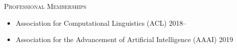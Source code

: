 \documentclass[11pt]{article}
\renewcommand{\section}[1]
{\vspace{1.0\baselineskip}{\Large\textbf{#1}}}
\newcommand{\makecolophon}
{\centering\ding{118} Last modified on \today~\ding{118}}
\begin{document}
\textsc{Professional Memberships}
\begin{itemize}[leftmargin=12pt]
  \item[] Association for Computational Linguistics (ACL) \hfill 2018--
  \item[] Association for the Advancement of Artificial Intelligence (AAAI) \hfill 2019
\end{itemize}




\end{document}
